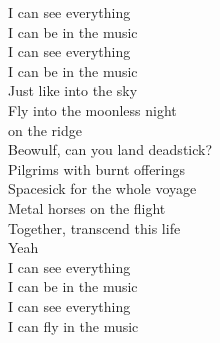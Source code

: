 I can see everything\\
I can be in the music\\
I can see everything\\
I can be in the music\\

Just like  into the sky\\
Fly into the moonless night\\
 on the ridge\\
Beowulf, can you land deadstick?\\
Pilgrims with burnt offerings\\
Spacesick for the whole voyage\\
Metal horses on the flight\\
Together, transcend this life\\
Yeah\\

I can see everything\\
I can be in the music\\
I can see everything\\
I can fly in the music\\
